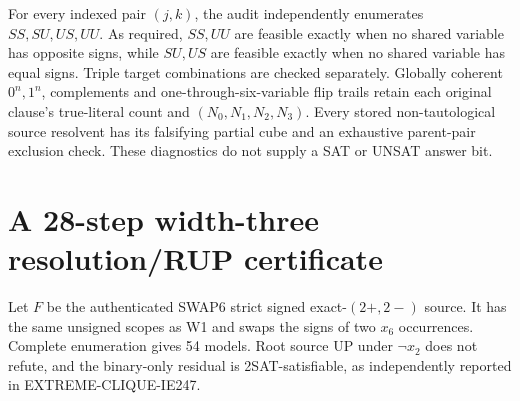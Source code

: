 \documentclass[10pt]{article}
\begin{document}
For every indexed pair $(j,k)$, the audit independently enumerates $SS,SU,US,UU$. As required, $SS,UU$ are feasible exactly when no shared variable has opposite signs, while $SU,US$ are feasible exactly when no shared variable has equal signs. Triple target combinations are checked separately. Globally coherent $0^n,1^n$, complements and one-through-six-variable flip trails retain each original clause's true-literal count and $(N_0,N_1,N_2,N_3)$. Every stored non-tautological source resolvent has its falsifying partial cube and an exhaustive parent-pair exclusion check. These diagnostics do not supply a SAT or UNSAT answer bit.

\section{A 28-step width-three resolution/RUP certificate}
Let $F$ be the authenticated SWAP6 strict signed exact-$(2+,2-)$ source. It has the same unsigned scopes as W1 and swaps the signs of two $x_6$ occurrences. Complete enumeration gives 54 models. Root source UP under $\neg x_2$ does not refute, and the binary-only residual is 2SAT-satisfiable, as independently reported in EXTREME-CLIQUE-IE247.
\end{document}
